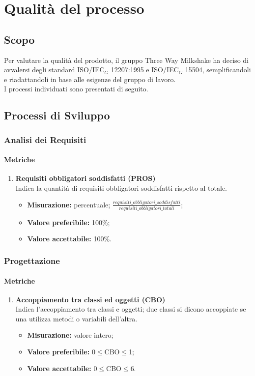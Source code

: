 

\section{Qualità del processo}

\subsection{Scopo}
Per valutare  la qualità del prodotto, il gruppo Three Way Milkshake ha deciso di avvalersi degli standard ISO/IEC$_G$ 12207:1995 e ISO/IEC$_G$ 15504, semplificandoli e riadattandoli in base alle esigenze del gruppo di lavoro.\\
I processi individuati sono presentati di seguito.

\subsection{Processi di Sviluppo}

	\subsubsection{Analisi dei Requisiti}
		\paragraph{Metriche} 
		\begin{enumerate}
		\item []
			 \textbf{Requisiti obbligatori soddisfatti (PROS)}\\
			Indica la quantità di requisiti obbligatori soddisfatti rispetto al totale.
			\begin{itemize}
				\item \textbf{Misurazione:} percentuale; $\frac{requisiti\_obbligatori\_soddisfatti}{requisiti\_obbligatori\_totali}$;
				\item \textbf{Valore preferibile:} 100\%;
				\item \textbf{Valore accettabile:} 100\%.
			\end{itemize}
		\end{enumerate}	
	\subsubsection{Progettazione}	
		\paragraph{Metriche} 
		\begin{enumerate}
		\item []
			\textbf{Accoppiamento tra classi ed oggetti (CBO)}\\ 
			Indica l'accoppiamento tra classi e oggetti; due classi si dicono accoppiate se una utilizza metodi o variabili dell'altra.
			\begin{itemize}
				\item \textbf{Misurazione:} valore intero;
				\item \textbf{Valore preferibile:} 0$\leq$CBO$\leq$1;
				\item \textbf{Valore accettabile:} 0$\leq$CBO$\leq$6.
			\end{itemize}
		\end{enumerate}
